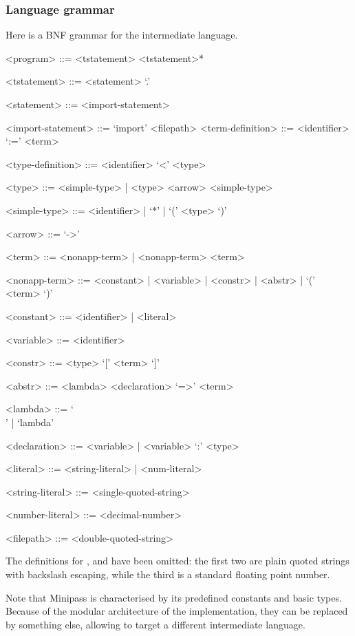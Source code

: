 \documentclass[main.tex]{subfiles}
\begin{document}
\subsubsection{Language grammar}
\label{minipass:grammar}
Here is a BNF grammar for the intermediate language.
\begin{grammar}
    <program> ::= <tstatement> <tstatement>*

    <tstatement> ::= <statement> `.'

    <statement>  ::= <import-statement>

    <import-statement> ::= `import' <filepath>
    <term-definition>  ::= <identifier> `:=' <term>

    <type-definition>  ::= <identifier> `<' <type>

    <type> ::= <simple-type> | <type> <arrow> <simple-type>

    <simple-type> ::= <identifier> | `*' | `(' <type> `)'

    <arrow> ::= `->'

    <term> ::= <nonapp-term> | <nonapp-term> <term>

    <nonapp-term> ::= <constant> | <variable> | <constr> | <abstr> | `(' <term> `)'

    <constant> ::= <identifier> | <literal>

    <variable> ::= <identifier>

    <constr> ::= <type> `[' <term> `]'

    <abstr> ::= <lambda> <declaration> `=>' <term>

    <lambda> ::= `\\' | `lambda'

    <declaration> ::= <variable> | <variable> `:' <type>

    <literal> ::= <string-literal> | <num-literal>

    <string-literal> ::= <single-quoted-string>

    <number-literal> ::= <decimal-number>

    <filepath> ::= <double-quoted-string>
\end{grammar}

The definitions for ,
and 
have been omitted: the first two are plain quoted strings with backslash escaping,
while the third is a standard floating point number.

Note that Minipass is characterised by its predefined constants and basic
types. Because of the modular architecture of the implementation, they can be
replaced by something else, allowing to target a different intermediate language.
\end{document}
